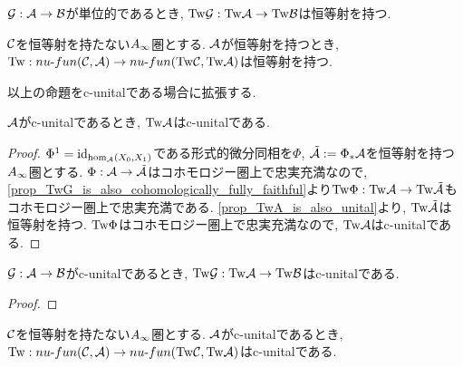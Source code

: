 \documentclass[uplatex, a4paper, 14Q, dvipdfmx]{jsarticle}
\begin{document}
\begin{lemma} \label{prop_TwG_is_also_unital}
  $\mathcal{G} : \mathcal{A} \to \mathcal{B}$が単位的であるとき, $\mathrm{Tw}\mathcal{G} : \mathrm{Tw}\mathcal{A} \to \mathrm{Tw}\mathcal{B}$は恒等射を持つ.
\end{lemma}

\begin{lemma} \label{prop_Tw_is_also_unital}
  $\mathcal{C}$を恒等射を持たない$A_{\infty}$圏とする. 
  $\mathcal{A}$が恒等射を持つとき, $\mathrm{Tw} : nu \text{-} fun (\mathcal{C}, \mathcal{A}) \to nu \text{-} fun (\mathrm{Tw}\mathcal{C}, \mathrm{Tw}\mathcal{A})$は恒等射を持つ.
\end{lemma}

以上の命題をc-unitalである場合に拡張する.

\begin{theorem} \label{prop_TwA_is_also_c_unital}
  $\mathcal{A}$がc-unitalであるとき, $\mathrm{Tw}\mathcal{A}$はc-unitalである.
\end{theorem}

\begin{proof}
  $\Phi^1=\mathrm{id}_{\hom_{\mathcal{A}}(X_0,X_1)}$である形式的微分同相を$\Phi$, $\tilde{\mathcal{A}} := \Phi_\ast \mathcal{A}$を恒等射を持つ$A_{\infty}$圏とする. 
  $\Phi : \mathcal{A} \to \tilde{\mathcal{A}}$はコホモロジー圏上で忠実充満なので, \cref{prop_TwG_is_also_cohomologically_fully_faithful}より$\mathrm{Tw}\Phi : \mathrm{Tw}\mathcal{A} \to \mathrm{Tw}\tilde{\mathcal{A}}$もコホモロジー圏上で忠実充満である.
  \cref{prop_TwA_is_also_unital}より, $\mathrm{Tw}\tilde{\mathcal{A}}$は恒等射を持つ.
  $\mathrm{Tw}\Phi$はコホモロジー圏上で忠実充満なので, $\mathrm{Tw}\mathcal{A}$はc-unitalである. 
\end{proof}

\begin{theorem} \label{prop_TwG_is_also_c_unital}
  $\mathcal{G} : \mathcal{A} \to \mathcal{B}$がc-unitalであるとき, $\mathrm{Tw}\mathcal{G} : \mathrm{Tw}\mathcal{A} \to \mathrm{Tw}\mathcal{B}$はc-unitalである.
\end{theorem}

\begin{proof}
  
\end{proof}

\begin{theorem} \label{prop_Tw_is_also_c_unital}
  $\mathcal{C}$を恒等射を持たない$A_{\infty}$圏とする. 
  $\mathcal{A}$がc-unitalであるとき, $\mathrm{Tw} : nu \text{-} fun (\mathcal{C}, \mathcal{A}) \to nu \text{-} fun (\mathrm{Tw}\mathcal{C}, \mathrm{Tw}\mathcal{A})$はc-unitalである.
\end{theorem}
\end{document}
